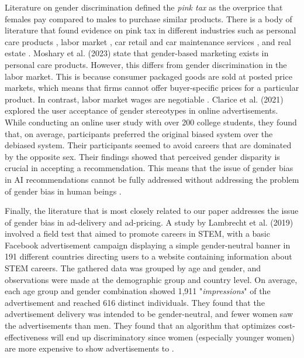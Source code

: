 \documentclass[twocolumn]{bmcart}\usepackage{lineno}
\begin{document}
Literature on gender discrimination defined the \emph{pink tax} as the overprice that females pay compared to males to purchase similar products. There is a  body of literature that found evidence on pink tax in different industries such as personal care products \cite{guittar2022beyond,duesterhaus2011cost}, labor market \cite{blau2017rthe}, car retail and car maintenance services \cite{morton2003consumer,busse2017repairing,goldberg1996dealer,ayres1995race,ayres1991fair}, and real estate \cite{goldsmith2020gender}. Moshary et al. (2023) state that gender-based marketing exists in personal care products. However, this differs from gender discrimination in the labor market. This is because consumer packaged goods are sold at posted price markets, which means that firms cannot offer buyer-specific prices for a particular product. In contrast, labor market wages are negotiable \cite{moshary2023gender}. Clarice et al. (2021) explored the user acceptance of gender stereotypes in online advertisements. While conducting an online user study with over 200 college students, they found that, on average, participants preferred the original biased system over the debiased system. Their participants seemed to avoid careers that are dominated by the opposite sex. Their findings showed that perceived gender disparity is crucial in accepting a recommendation. This means that the issue of gender bias in AI recommendations cannot be fully addressed without addressing the problem of gender bias in human beings \cite{wang2021user}.


Finally, the literature that is most closely related to our paper addresses the issue of gender bias in ad-delivery and ad-pricing.
A study by Lambrecht et al. (2019) involved a field test that aimed to promote careers in STEM, with a basic Facebook advertisement campaign displaying a simple gender-neutral banner in 191 different countries directing users to a website containing information about STEM careers. The gathered data was grouped by age and gender, and observations were made at the demographic group and country level. On average, each age group and gender combination showed 1,911 "\emph{impressions}" of the advertisement and reached 616 distinct individuals. They found that the advertisement delivery was intended to be gender-neutral, and fewer women saw the advertisements than men. They found that an algorithm that optimizes cost-effectiveness will end up discriminatory since women (especially younger women) are more expensive to show advertisements to \cite{lambrecht2019algorithmic}.
 
\end{document}
